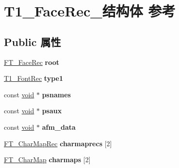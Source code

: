 \hypertarget{struct_t1___face_rec__}{}\section{T1\+\_\+\+Face\+Rec\+\_\+结构体 参考}
\label{struct_t1___face_rec__}
\subsection*{Public 属性}
\begin{DoxyCompactItemize}
\item 
\mbox{\label{struct_t1___face_rec___a43be05c1ded91ee98e851f285b97f2e8}} 
\hyperlink{struct_f_t___face_rec__}{F\+T\+\_\+\+Face\+Rec} {\bfseries root}
\item 
\mbox{\label{struct_t1___face_rec___aa1b8f09752d662d2dca26ed8bc00d782}} 
\hyperlink{struct_t1___font_rec__}{T1\+\_\+\+Font\+Rec} {\bfseries type1}
\item 
\mbox{\label{struct_t1___face_rec___ad685d33071eb00bfe3c9b7d3b91f7405}} 
const \hyperlink{interfacevoid}{void} $\ast$ {\bfseries psnames}
\item 
\mbox{\label{struct_t1___face_rec___a33673d6f5c7f690a45e59f79dbf9c77f}} 
const \hyperlink{interfacevoid}{void} $\ast$ {\bfseries psaux}
\item 
\mbox{\label{struct_t1___face_rec___afbaa364af232b37ec67dec7c99db773c}} 
const \hyperlink{interfacevoid}{void} $\ast$ {\bfseries afm\+\_\+data}
\item 
\mbox{\label{struct_t1___face_rec___a017b1eee73523b188e6d2a25881d6852}} 
\hyperlink{struct_f_t___char_map_rec__}{F\+T\+\_\+\+Char\+Map\+Rec} {\bfseries charmaprecs} \mbox{[}2\mbox{]}
\item 
\mbox{\label{struct_t1___face_rec___a1e9ad3418fbff6b1594db5beddd9b5a8}} 
\hyperlink{struct_f_t___char_map_rec__}{F\+T\+\_\+\+Char\+Map} {\bfseries charmaps} \mbox{[}2\mbox{]}
\item 
\mbox{\label{struct_t1___face_rec___a51e4e76f9988ec601d1fec6b5d4611db}} 

\end{DoxyCompactItemize}

